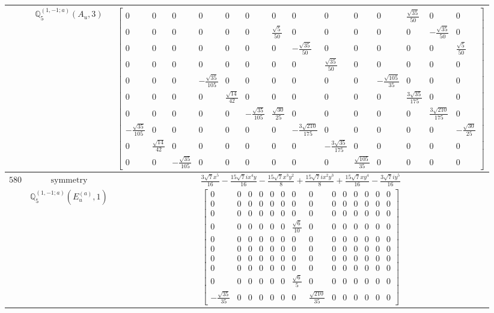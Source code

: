 \documentclass[fleqn,8pt,landscape]{jsarticle}
\begin{document}
\begin{longtable}{ccc}
$  $ & $ \mathbb{Q}_{5}^{(1,-1;a)}(A_{u},3) $ & $ \begin{bmatrix} 0 & 0 & 0 & 0 & 0 & 0 & 0 & 0 & 0 & 0 & 0 & \frac{\sqrt{35}}{50} & 0 & 0 \\ 0 & 0 & 0 & 0 & 0 & 0 & \frac{\sqrt{5}}{50} & 0 & 0 & 0 & 0 & 0 & - \frac{\sqrt{35}}{50} & 0 \\ 0 & 0 & 0 & 0 & 0 & 0 & 0 & - \frac{\sqrt{35}}{50} & 0 & 0 & 0 & 0 & 0 & \frac{\sqrt{5}}{50} \\ 0 & 0 & 0 & 0 & 0 & 0 & 0 & 0 & \frac{\sqrt{35}}{50} & 0 & 0 & 0 & 0 & 0 \\ 0 & 0 & 0 & - \frac{\sqrt{35}}{105} & 0 & 0 & 0 & 0 & 0 & 0 & - \frac{\sqrt{105}}{35} & 0 & 0 & 0 \\ 0 & 0 & 0 & 0 & \frac{\sqrt{14}}{42} & 0 & 0 & 0 & 0 & 0 & 0 & \frac{3 \sqrt{35}}{175} & 0 & 0 \\ 0 & 0 & 0 & 0 & 0 & - \frac{\sqrt{35}}{105} & \frac{\sqrt{30}}{25} & 0 & 0 & 0 & 0 & 0 & \frac{3 \sqrt{210}}{175} & 0 \\ - \frac{\sqrt{35}}{105} & 0 & 0 & 0 & 0 & 0 & 0 & - \frac{3 \sqrt{210}}{175} & 0 & 0 & 0 & 0 & 0 & - \frac{\sqrt{30}}{25} \\ 0 & \frac{\sqrt{14}}{42} & 0 & 0 & 0 & 0 & 0 & 0 & - \frac{3 \sqrt{35}}{175} & 0 & 0 & 0 & 0 & 0 \\ 0 & 0 & - \frac{\sqrt{35}}{105} & 0 & 0 & 0 & 0 & 0 & 0 & \frac{\sqrt{105}}{35} & 0 & 0 & 0 & 0 \end{bmatrix} $ \\ \hline
$ 580 $ & $ \text{symmetry} $ & $ \frac{3 \sqrt{7} x^{5}}{16} - \frac{15 \sqrt{7} i x^{4} y}{16} - \frac{15 \sqrt{7} x^{3} y^{2}}{8} + \frac{15 \sqrt{7} i x^{2} y^{3}}{8} + \frac{15 \sqrt{7} x y^{4}}{16} - \frac{3 \sqrt{7} i y^{5}}{16} $ \\
$  $ & $ \mathbb{Q}_{5}^{(1,-1;a)}(E_{u}^{(a)},1) $ & $ \begin{bmatrix} 0 & 0 & 0 & 0 & 0 & 0 & 0 & 0 & 0 & 0 & 0 & 0 & 0 & 0 \\ 0 & 0 & 0 & 0 & 0 & 0 & 0 & 0 & 0 & 0 & 0 & 0 & 0 & 0 \\ 0 & 0 & 0 & 0 & 0 & 0 & 0 & 0 & 0 & 0 & 0 & 0 & 0 & 0 \\ 0 & 0 & 0 & 0 & 0 & 0 & \frac{\sqrt{6}}{10} & 0 & 0 & 0 & 0 & 0 & 0 & 0 \\ 0 & 0 & 0 & 0 & 0 & 0 & 0 & 0 & 0 & 0 & 0 & 0 & 0 & 0 \\ 0 & 0 & 0 & 0 & 0 & 0 & 0 & 0 & 0 & 0 & 0 & 0 & 0 & 0 \\ 0 & 0 & 0 & 0 & 0 & 0 & 0 & 0 & 0 & 0 & 0 & 0 & 0 & 0 \\ 0 & 0 & 0 & 0 & 0 & 0 & 0 & 0 & 0 & 0 & 0 & 0 & 0 & 0 \\ 0 & 0 & 0 & 0 & 0 & 0 & \frac{\sqrt{6}}{5} & 0 & 0 & 0 & 0 & 0 & 0 & 0 \\ - \frac{\sqrt{35}}{35} & 0 & 0 & 0 & 0 & 0 & 0 & \frac{\sqrt{210}}{35} & 0 & 0 & 0 & 0 & 0 & 0 \end{bmatrix} $ \\ \hline

\end{longtable}
\end{document}
